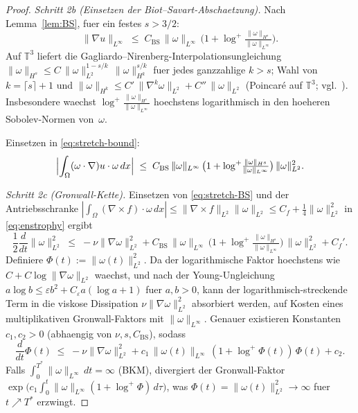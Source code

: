 \documentclass[12pt,a4paper]{article}
\theoremstyle{definition}
\theoremstyle{plain}
\theoremstyle{remark}
\begin{document}
\begin{proof}
\smallskip
\noindent\emph{Schritt 2b (Einsetzen der Biot--Savart-Abschaetzung).}
Nach Lemma~\ref{lem:BS}, fuer ein festes $s > 3/2$:
\[
    \|\nabla u\|_{L^\infty}
    \;\le\; C_{\mathrm{BS}}\,\|\omega\|_{L^\infty}\,
            \bigl(1 + \log^+\!\tfrac{\|\omega\|_{H^s}}{\|\omega\|_{L^\infty}}\bigr).
\]
Auf $\mathbb{T}^3$ liefert die Gagliardo--Nirenberg-Interpolationsungleichung
$\|\omega\|_{H^s} \le C\,\|\omega\|_{L^2}^{1-s/k}\,\|\omega\|_{H^k}^{s/k}$
fuer jedes ganzzahlige $k > s$; Wahl von $k = \lceil s \rceil + 1$ und
$\|\omega\|_{H^k} \le C'\,\|\nabla^k \omega\|_{L^2} + C''\,\|\omega\|_{L^2}$
(Poincar\'{e} auf $\mathbb{T}^3$; vgl.\ \cite{ConstantinFoias1988}).
Insbesondere waechst $\log^+\!\tfrac{\|\omega\|_{H^s}}{\|\omega\|_{L^\infty}}$
hoechstens logarithmisch in den hoeheren Sobolev-Normen von~$\omega$.

Einsetzen in \eqref{eq:stretch-bound}:
\begin{equation}\label{eq:stretch-BS}
    \Bigl|\int_\Omega (\omega\cdot\nabla)u\cdot\omega\,dx\Bigr|
    \;\le\; C_{\mathrm{BS}}\,\|\omega\|_{L^\infty}\,
            \bigl(1 + \log^+\!\tfrac{\|\omega\|_{H^s}}{\|\omega\|_{L^\infty}}\bigr)\,
            \|\omega\|_{L^2}^2.
\end{equation}

\smallskip
\noindent\emph{Schritt 2c (Gronwall-Kette).}
Einsetzen von \eqref{eq:stretch-BS} und der Antriebsschranke
$|\int_\Omega(\nabla\times f)\cdot\omega\,dx|
\le \|\nabla\times f\|_{L^2}\|\omega\|_{L^2}
\le C_f + \tfrac{1}{4}\|\omega\|_{L^2}^2$ in \eqref{eq:enstrophy} ergibt
\[
    \frac{1}{2}\frac{d}{dt}\|\omega\|_{L^2}^2
    \;\le\;
    -\nu\|\nabla\omega\|_{L^2}^2
    + C_{\mathrm{BS}}\,\|\omega\|_{L^\infty}\,
      \bigl(1 + \log^+\!\tfrac{\|\omega\|_{H^s}}{\|\omega\|_{L^\infty}}\bigr)\,
      \|\omega\|_{L^2}^2
    + C_f'.
\]
Definiere $\Phi(t) := \|\omega(t)\|_{L^2}^2$. Da der logarithmische Faktor
hoechstens wie $C + C\log\|\nabla\omega\|_{L^2}$ waechst, und nach der Young-Ungleichung
$a\log b \le \varepsilon b^2 + C_\varepsilon a(\log a + 1)$ fuer $a,b > 0$,
kann der logarithmisch-streckende Term in die viskose Dissipation
$\nu\|\nabla\omega\|_{L^2}^2$ absorbiert werden, auf Kosten eines multiplikativen Gronwall-Faktors
mit $\|\omega\|_{L^\infty}$. Genauer existieren Konstanten
$c_1, c_2 > 0$ (abhaengig von $\nu, s, C_{\mathrm{BS}}$), sodass
\begin{equation}\label{eq:Gronwall-enst}
    \frac{d}{dt}\Phi(t)
    \;\le\;
    -\nu\|\nabla\omega\|_{L^2}^2
    + c_1\,\|\omega(t)\|_{L^\infty}\,(1 + \log^+\Phi(t))\,\Phi(t)
    + c_2.
\end{equation}
Falls $\int_0^{T^*}\|\omega\|_{L^\infty}\,dt = \infty$ (BKM), divergiert der
Gronwall-Faktor $\exp\!\bigl(c_1\int_0^t\|\omega\|_{L^\infty}(1+\log^+\Phi)\,d\tau\bigr)$,
was $\Phi(t) = \|\omega(t)\|_{L^2}^2 \to \infty$ fuer
$t \nearrow T^*$ erzwingt.


\end{proof}
\end{document}
